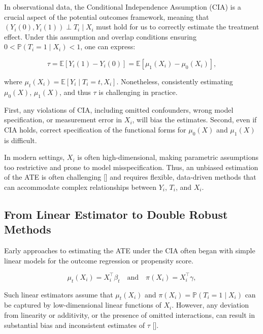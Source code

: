 \documentclass{article}
\numberwithin{equation}{section}
\begin{document}
In observational data, the Conditional Independence Assumption (CIA) is a crucial aspect of the potential outcomes framework, meaning that \((Y_i(0), Y_i(1)) \perp T_i \mid X_i\) must hold for us to correctly estimate the treatment effect. Under this assumption and overlap conditions ensuring \(0 < \mathbb{P}(T_i=1 \mid X_i) < 1\), one can express:

\begin{equation}
    \tau = \mathbb{E}[Y_i(1) - Y_i(0)] = \mathbb{E}[\mu_1(X_i) - \mu_0(X_i)],
\label{eq:tau_hat_potential_outcome_diff_means}
\end{equation}

where \(\mu_t(X_i) = \mathbb{E}[Y_i \mid T_i = t, X_i]\). Nonetheless, consistently estimating \(\mu_0(X)\), \(\mu_1(X)\), and thus \(\tau\) is challenging in practice.

First, any violations of CIA, including omitted confounders, wrong model specification, or measurement error in \(X_i\), will bias the estimates. Second, even if CIA holds, correct specification of the functional forms for \(\mu_0(X)\) and \(\mu_1(X)\) is difficult.

In modern settings, \(X_i\) is often high-dimensional, making parametric assumptions too restrictive and prone to model misspecification. Thus, an unbiased estimation of the ATE is often challenging [\cite{Chernozhukov2018}] and requires flexible, data-driven methods that can accommodate complex relationships between \(Y_i\), \(T_i\), and \(X_i\).

\subsection{From Linear Estimator to Double Robust Methods}
\label{subsec:from_linear_estimator_to_double_robust_methods}

Early approaches to estimating the ATE under the CIA often began with simple linear models for the outcome regression or propensity score. 

\begin{equation}
    \mu_t(X_i) = X_i^\top \beta_t \quad \text{and} \quad \pi(X_i) = X_i^\top \gamma,
\label{eq:linear_assumption_example}
\end{equation}

Such linear estimators assume that \(\mu_t(X_i)\) and \(\pi(X_i)=\mathbb{P}(T_i=1 \mid X_i)\) can be captured by low-dimensional linear functions of \(X_i\). However, any deviation from linearity or additivity, or the presence of omitted interactions, can result in substantial bias and inconsistent estimates of \(\tau\) [\cite{ImbensRubin2015}].
\end{document}
